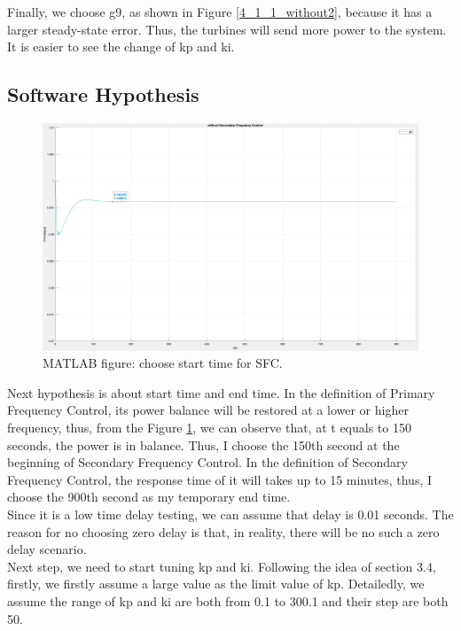 \documentclass{report}
\begin{document}
Finally, we choose g9, as shown in Figure \textcolor{red}{\ref{4_1_1_without2}}, because it has a larger steady-state error. Thus, the turbines will send more power to the system. It is easier to see the change of kp and ki.\\

\subsection{Software Hypothesis} %

\begin{figure}[htbp]
\centering
\includegraphics[width = .891\textwidth]{figure/4_1_1_without3.jpeg}
\caption{MATLAB figure: choose start time for SFC.}
\label{4_1_1_without3}
\end{figure}
Next hypothesis is about start time and end time. In the definition of Primary Frequency Control, its power balance will be restored at a lower or higher frequency, thus, from the Figure \textcolor{red}{\ref{4_1_1_without3}}, we can observe that, at t equals to 150 seconds, the power is in balance. Thus, I choose the 150th second at the beginning of Secondary Frequency Control. In the definition of Secondary Frequency Control, the response time of it will takes up to 15 minutes, thus, I choose the 900th second as my temporary end time.\\

Since it is a low time delay testing, we can assume that delay is 0.01 seconds. The reason for no choosing zero delay is that, in reality, there will be no such a zero delay scenario.\\

Next step, we need to start tuning kp and ki. Following the idea of section 3.4, firstly, we firstly assume a large value as the limit value of kp. Detailedly, we assume the range of kp and ki are both from 0.1 to 300.1 and their step are both 50. \\
\end{document}
